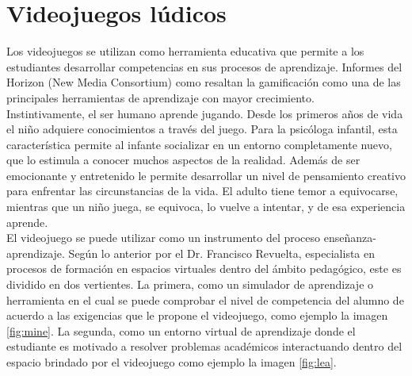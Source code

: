 \section{Videojuegos lúdicos}

Los videojuegos se utilizan como herramienta educativa que permite a los estudiantes desarrollar competencias en sus procesos de aprendizaje. Informes del Horizon (New Media Consortium) como \cite[Games and gamification]{vid07} resaltan la gamificación como una de las principales herramientas de aprendizaje con mayor crecimiento.
\\[1pt]

Instintivamente, el ser humano aprende jugando. Desde los primeros años de vida el niño adquiere conocimientos a través del juego. Para la psicóloga infantil, esta característica permite al infante socializar en un entorno completamente nuevo, que lo estimula a conocer muchos aspectos de la realidad. Además de ser emocionante y entretenido le permite desarrollar un nivel de pensamiento creativo para enfrentar las circunstancias de la vida. El adulto tiene temor a equivocarse, mientras que un niño juega, se equivoca, lo vuelve a intentar, y de esa experiencia aprende.
\\[1pt]

El videojuego se puede utilizar como un instrumento del proceso enseñanza-aprendizaje. Según lo anterior por el Dr. Francisco Revuelta, especialista en procesos de formación en espacios virtuales dentro del ámbito pedagógico, este es dividido en dos vertientes. La primera, como un simulador de aprendizaje o herramienta en el cual se puede comprobar el nivel de competencia del alumno de acuerdo a las exigencias que le propone el videojuego, como ejemplo la imagen \ref{fig:mine}. La segunda, como un entorno virtual de aprendizaje donde el estudiante es motivado a resolver problemas académicos interactuando dentro del espacio brindado por el videojuego\cite{vid06} como ejemplo la imagen \ref{fig:lea}.
\\[1pt]

